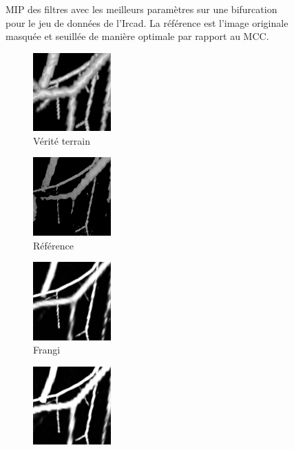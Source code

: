 \begin{figure}[H]
      \caption{MIP des filtres avec les meilleurs paramètres sur une bifurcation pour le jeu de données de l'Ircad. La référence est l'image originale masquée et seuillée de manière optimale par rapport au MCC.
      }
      \label{fig:bifurcation_Ircad}
  \end{figure}
  
  \begin{figure}[H]
    \centering
    \begin{subfigure}[t]{0.24\textwidth}
      \includegraphics[clip = true, trim  =  170 230 150 240, width=30mm]{Images/Vascu_2_k_GT.png}
      \caption{Vérité terrain}
    \end{subfigure}
    \begin{subfigure}[t]{0.24\textwidth}
      \includegraphics[clip = true, trim  =  170 230 150 240, width=30mm]{Images/Vascu_2_k_Baseline.png}
      \caption{Référence}
    \end{subfigure}
    \begin{subfigure}[t]{0.24\textwidth}
      \includegraphics[clip = true, trim  =  170 230 150 240, width=30mm]{Images/Vascu_2_k_Frangi.png}
      \caption{Frangi}
    \end{subfigure}
    \begin{subfigure}[t]{0.24\textwidth}
      \includegraphics[clip = true, trim  =  170 230 150 240, width=30mm]{Images/Vascu_2_k_Jerman.png}

\end{subfigure}
\end{figure}
